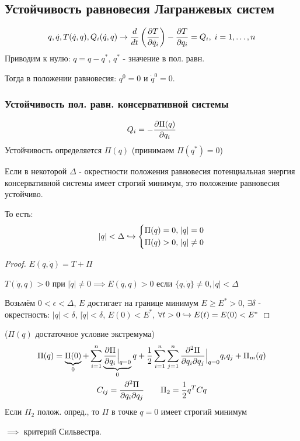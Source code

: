 \documentclass{article}
\begin{document}

\subsection{Устойчивость равновесия Лагранжевых систем}
\[
  q, \dot{q}, T(\dot{q},q), Q_i(\dot{q},q) \rightarrow \frac{d}{dt}\left(\frac{\partial{T}}{\partial{\dot{q}_i}}\right) - \frac{\partial{T}}{\partial{q_i}}=Q_i, \; i =1,\dots ,n
\]
Приводим к нулю: $q=q-q^{*}$, $q^{*}$ - значение в пол. равн.

Тогда в положении равновесия: $q^{0}=0$ и $\dot{q}^{0}=0$.

\subsubsection{Устойчивость пол. равн. консервативной системы}
\[
  Q_i=-\frac{\partial{\Pi(q)}}{\partial{q_i}}
\]
Устойчивость определяется $\Pi(q)$ (принимаем $\Pi(q^{*})=0$)
\begin{theorem}
  Если в некоторой $\Delta$ - окрестности положения равновесия 
  потенциальная энергия консервативной системы имеет строгий минимум,
  это положение равновесия устойчиво.

  То есть:
  \[
    |q|<\Delta \hookrightarrow \left\{\begin{aligned}
        \Pi(q)=0, & \; |q|=0 \\
        \Pi(q)>0, & \; |q| \neq 0
    \end{aligned}\right.
  \]
\end{theorem}
\begin{proof}
  $E(q,\dot{q})=T+\Pi$

  $T(\dot{q},q)>0$ при $|\dot{q}|\neq 0 \implies E(\dot{q},q)>0$ если $\{q,\dot{q}\}\neq 0, |q|<\Delta$

  Возьмём $0<\epsilon<\Delta$, $E$ достигает на границе минимум $E \ge E^{*} > 0$,
  $\exists \delta$ - окрестность: $|q|<\delta$, $|\dot{q}|<\delta$, $E(0)<E^{*}$,
  $\forall t>0 \hookrightarrow E(t)=E(0)<E^{*}$
\end{proof}

\begin{theorem}($\Pi(q)$ достаточное условие экстремума)
\begin{gather*}
 \Pi(q)=\underbrace{\Pi(0)}_{0} + \sum_{i=1}^{n}\underbrace{\frac{\partial{\Pi}}{\partial{q_i}}\Big|_{q=0}}_{0}q 
 + \frac{1}{2}\sum_{i=1}^{n}\sum_{j=1}^{n}\frac{\partial^{2}\Pi}{\partial q_i \partial q_j} \Big|_{q=0}q_i q_j + \Pi_{m}(q) \\ 
 C_{ij}=\frac{\partial^{2}\Pi}{\partial q_i \partial q_j} \qquad \Pi_2=\frac{1}{2}q^{T}Cq
\end{gather*}
Если $\Pi_2$ полож. опред., то $\Pi$ в точке $q=0$ имеет строгий минимум

$\implies$ критерий Сильвестра.
\end{theorem}
\end{document}
